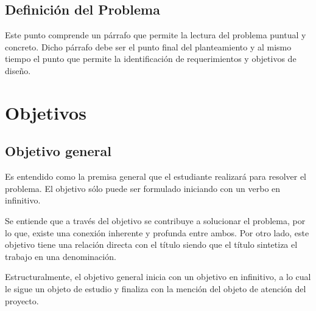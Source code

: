 \subsection{Definición del Problema}
Este punto comprende un párrafo que permite la lectura del problema puntual y concreto. Dicho párrafo debe ser el punto final del planteamiento y al mismo tiempo el punto que permite la identificación de requerimientos y objetivos de diseño. 

\section{Objetivos}
\subsection{Objetivo general}
Es entendido como la premisa general que el estudiante realizará para resolver el problema. El objetivo sólo puede ser formulado iniciando con un verbo en infinitivo.

Se entiende que a través del objetivo se contribuye a solucionar el problema, por lo que, existe una conexión inherente y profunda entre ambos. Por otro lado, este objetivo tiene una relación directa con el título siendo que el título sintetiza el trabajo en una denominación. 

Estructuralmente, el objetivo general inicia con un objetivo en infinitivo, a lo cual le sigue un objeto de estudio y finaliza con la mención del objeto de atención del proyecto.

